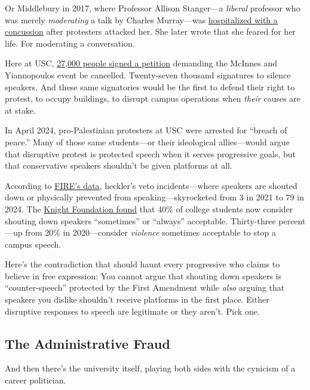 \documentclass[11pt]{article}
\begin{document}
Or Middlebury in 2017, where Professor Allison Stanger---a \textit{liberal} professor who was merely \textit{moderating} a talk by Charles Murray---was \href{https://www.thefire.org/research-learn/campus-deplatforming-database}{hospitalized with a concussion} after protesters attacked her. She later wrote that she feared for her life. For moderating a conversation.

Here at USC, \href{https://www.postandcourier.com/education-lab/usc-doj-charlie-kirk-outdoor-event-controversial/article_c1d6ca0b-1173-403d-bd16-6f8fec66f748.html}{27,000 people signed a petition} demanding the McInnes and Yiannopoulos event be cancelled. Twenty-seven thousand signatures to silence speakers. And these same signatories would be the first to defend their right to protest, to occupy buildings, to disrupt campus operations when \textit{their} causes are at stake.

In April 2024, pro-Palestinian protesters at USC were arrested for ``breach of peace.'' Many of those same students---or their ideological allies---would argue that disruptive protest is protected speech when it serves progressive goals, but that conservative speakers shouldn't be given platforms at all.

According to \href{https://www.thefire.org/research-learn/campus-deplatforming-database}{FIRE's data}, heckler's veto incidents---where speakers are shouted down or physically prevented from speaking---skyrocketed from 3 in 2021 to 79 in 2024. The \href{https://knightfoundation.org/reports/college-student-views-on-free-expression-and-campus-speech-2024/}{Knight Foundation found} that 40\% of college students now consider shouting down speakers ``sometimes'' or ``always'' acceptable. Thirty-three percent---up from 20\% in 2020---consider \textit{violence} sometimes acceptable to stop a campus speech.

Here's the contradiction that should haunt every progressive who claims to believe in free expression: You cannot argue that shouting down speakers is ``counter-speech'' protected by the First Amendment while \textit{also} arguing that speakers you dislike shouldn't receive platforms in the first place. Either disruptive responses to speech are legitimate or they aren't. Pick one.

\subsection{The Administrative Fraud}

And then there's the university itself, playing both sides with the cynicism of a career politician.
\end{document}
